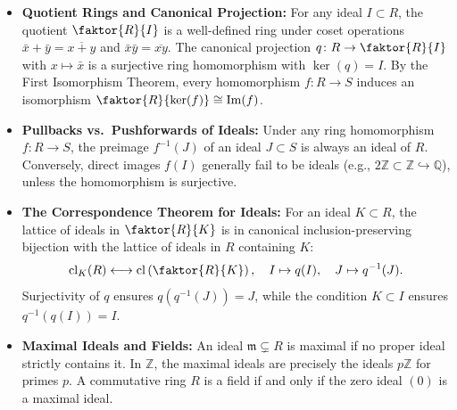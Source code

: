 \begin{overview}
\begin{itemize}
    \item \textbf{Quotient Rings and Canonical Projection:} For any ideal $I \subset R$, the quotient $\faktor{R}{I}$ is a well-defined ring under coset operations $\bar{x} + \bar{y} = \overline{x+y}$ and $\bar{x} \bar{y} = \overline{x y}$. The canonical projection $q \colon R \to \faktor{R}{I}$ with $x \mapsto \bar{x}$ is a surjective ring homomorphism with $\ker(q) = I$. By the First Isomorphism Theorem, every homomorphism $f \colon R \to S$ induces an isomorphism $\faktor{R}{\ker(f)} \cong \operatorname{Im}(f)$.
    \item \textbf{Pullbacks vs.\ Pushforwards of Ideals:} Under any ring homomorphism $f \colon R \to S$, the preimage $f^{-1}(J)$ of an ideal $J \subset S$ is always an ideal of $R$. Conversely, direct images $f(I)$ generally fail to be ideals (e.g., $2\mathbb{Z} \subset \mathbb{Z} \hookrightarrow \mathbb{Q}$), unless the homomorphism is surjective.
    \item \textbf{The Correspondence Theorem for Ideals:} For an ideal $K \subset R$, the lattice of ideals in $\faktor{R}{K}$ is in canonical inclusion-preserving bijection with the lattice of ideals in $R$ containing $K$:
    \[
    \operatorname{cl}_K(R) \longleftrightarrow \operatorname{cl}\left(\faktor{R}{K}\right), \quad I \mapsto q(I), \quad J \mapsto q^{-1}(J).
    \]
    Surjectivity of $q$ ensures $q(q^{-1}(J)) = J$, while the condition $K \subset I$ ensures $q^{-1}(q(I)) = I$.
    \item \textbf{Maximal Ideals and Fields:} An ideal $\mathfrak{m} \subsetneq R$ is maximal if no proper ideal strictly contains it. In $\mathbb{Z}$, the maximal ideals are precisely the ideals $p\mathbb{Z}$ for primes $p$. A commutative ring $R$ is a field if and only if the zero ideal $(0)$ is a maximal ideal.
\end{itemize}
\end{overview}